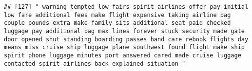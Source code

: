 \documentclass[
]{article}
\begin{document}
\begin{verbatim}
## [127] " warning tempted low fairs spirit airlines offer pay initial low fare additional fees make flight expensive taking airline bag couple pounds extra make family sits additional seat paid checked luggage pay additional bag max lines forever stuck security made gate door opened shut standing boarding passes hand care rebook flights day means miss cruise ship luggage plane southwest found flight make ship spirit phone luggage minutes port answered cared made cruise luggage contacted spirit airlines back explained situation "                                                                                                                                                                                                                                                                                                                                                                                                                                                                                                                                                                                                                                                                                                                                                                                                                                                                                                                                                                                                                                                                                                                                                                                                                                                  

\end{verbatim}
\end{document}
